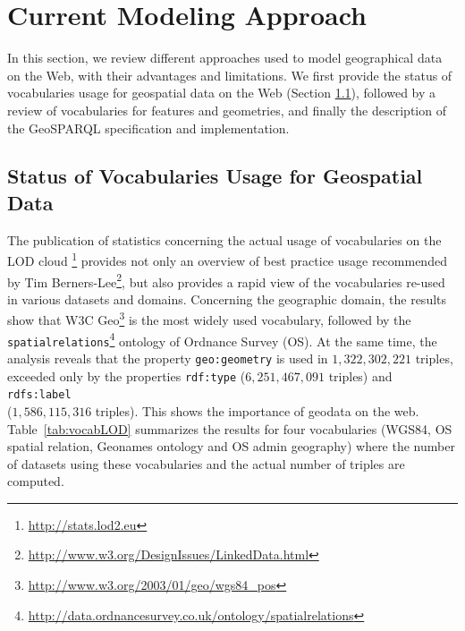 \section{Current Modeling Approach}
\label{sec:currentmodel}
In this section, we review different approaches used to model geographical data on the Web, with their advantages and limitations.
We first provide the status of vocabularies usage for geospatial data on the Web (Section \ref{sec:vocgeoreview}), followed by a review of vocabularies for features and geometries, and finally the description of the GeoSPARQL specification and implementation.
 
\subsection{Status of Vocabularies Usage for Geospatial Data}
\label{sec:vocgeoreview}

The publication \cite{demter-2012-ekaw} of statistics concerning the actual usage of vocabularies on the LOD cloud \footnote{\url{http://stats.lod2.eu}} provides not only an overview of best practice usage recommended by Tim Berners-Lee\footnote{\url{http://www.w3.org/DesignIssues/LinkedData.html}}, but also provides a rapid view of the vocabularies re-used in various datasets and domains. Concerning the geographic domain, the results show that W3C Geo\footnote{\url{http://www.w3.org/2003/01/geo/wgs84_pos}} is the most widely used vocabulary, followed by the \texttt{spatialrelations}\footnote{\url{http://data.ordnancesurvey.co.uk/ontology/spatialrelations}} ontology of Ordnance Survey (OS). At the same time, the analysis reveals that the property \texttt{geo:geometry} is used in $1,322,302,221$ triples, exceeded only by the properties \texttt{rdf:type} ($6,251,467,091$ triples) and \texttt{rdfs:label}\\($1,586,115,316$ triples). This shows the importance of geodata on the web. Table~\ref{tab:vocabLOD} summarizes the results for four vocabularies (WGS84, OS spatial relation, Geonames ontology and OS admin geography) where the number of datasets using these vocabularies and the actual number of triples are computed.

